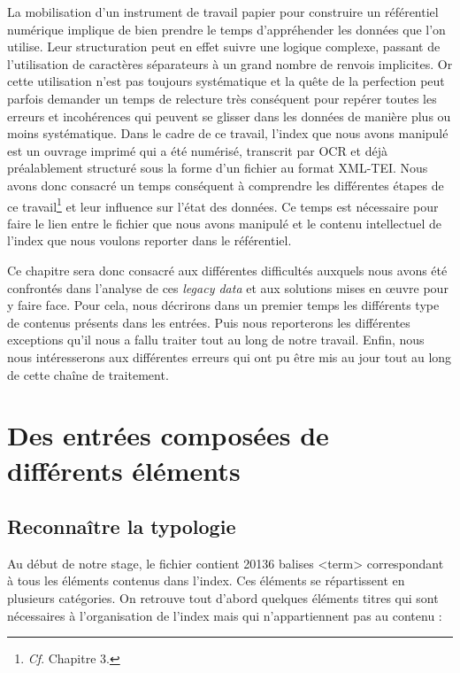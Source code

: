 \documentclass[a4paper,12pt,twoside]{book}
\begin{document}
	La mobilisation d'un instrument de travail papier pour construire un référentiel numérique implique de bien prendre le temps d'appréhender les données que l'on utilise. Leur structuration peut en effet suivre une logique complexe, passant de l'utilisation de caractères séparateurs à un grand nombre de renvois implicites. Or cette utilisation n'est pas toujours systématique et la quête de la perfection peut parfois demander un temps de relecture très conséquent pour repérer toutes les erreurs et incohérences qui peuvent se glisser dans les données de manière plus ou moins systématique. Dans le cadre de ce travail, l'index que nous avons manipulé est un ouvrage imprimé qui a été numérisé, transcrit par OCR et déjà préalablement structuré sous la forme d'un fichier au format XML-TEI. Nous avons donc consacré un temps conséquent à comprendre les différentes étapes de ce travail\footnote{\textit{Cf}. Chapitre 3.} et leur influence sur l'état des données. Ce temps est nécessaire pour faire le lien entre le fichier que nous avons manipulé et le contenu intellectuel de l'index que nous voulons reporter dans le référentiel.
	
	Ce chapitre sera donc consacré aux différentes difficultés auxquels nous avons été confrontés dans l'analyse de ces \textit{legacy data} et aux solutions mises en œuvre pour y faire face. Pour cela, nous décrirons dans un premier temps les différents type de contenus présents dans les entrées. Puis nous reporterons les différentes exceptions qu'il nous a fallu traiter tout au long de notre travail. Enfin, nous nous intéresserons aux différentes erreurs qui ont pu être mis au jour tout au long de cette chaîne de traitement.
	
	\section{Des entrées composées de différents éléments}
	
	\subsection{Reconnaître la typologie}
	
	Au début de notre stage, le fichier contient 20136 balises <term> correspondant à tous les éléments contenus dans l'index. Ces éléments se répartissent en plusieurs catégories. On retrouve tout d'abord quelques éléments titres qui sont nécessaires à l'organisation de l'index mais qui n'appartiennent pas au contenu :
	
\end{document}
